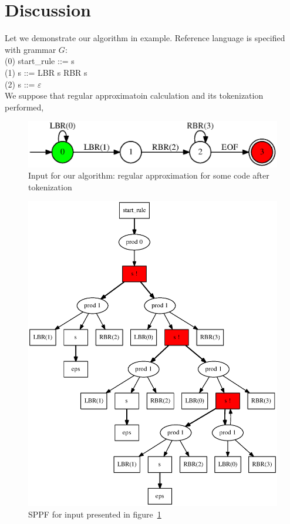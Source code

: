\section{Discussion}

Let we demonstrate our algorithm in example. Reference language is specified with grammar $G$:\\
(0) start\_rule ::= s \\
(1) s ::= LBR s RBR s\\
(2) s ::= $\varepsilon$ \\

We suppose that regular approximatoin calculation and its tokenization performed, 

\begin{figure}
    \begin{center}
        \includegraphics[scale=0.5]{dot/in3.eps}
    \end{center}
    \caption{Input for our algorithm: regular approximation for some code after tokenization} 
    \label{faApprox}
\end{figure}

\begin{figure}
    \begin{center}
        \includegraphics[scale=0.5]{dot/out3.eps}
    \end{center}
    \caption{SPPF for input presented in figure~\ref{faApprox}}
    \label{resultSPPF}
\end{figure}



